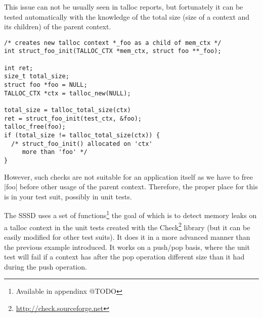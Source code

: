 This issue can not be usually seen in talloc reports, but fortunately it can be
tested automatically with the knowledge of the total size (size of a context and
its children) of the parent context.

\begin{lstlisting}[caption={Memory leaks detection \#1},
morekeywords={talloc_total_size,talloc_free}]
/* creates new talloc context *_foo as a child of mem_ctx */
int struct_foo_init(TALLOC_CTX *mem_ctx, struct foo **_foo);

int ret;
size_t total_size;
struct foo *foo = NULL;
TALLOC_CTX *ctx = talloc_new(NULL);

total_size = talloc_total_size(ctx)
ret = struct_foo_init(test_ctx, &foo);
talloc_free(foo);
if (total_size != talloc_total_size(ctx)) {
  /* struct_foo_init() allocated on 'ctx'
     more than 'foo' */
}
\end{lstlisting}

\noindent
However, such checks are not suitable for an application itself as we have to
free |foo| before other usage of the parent context. Therefore, the proper place
for this is in your test suit, possibly in unit tests.

The SSSD uses a set of functions\footnote{Available in appendinx @TODO} the goal
of which is to detect memory leaks on a talloc context in the unit tests created
with the Check\footnote{\url{http://check.sourceforge.net}} library (but it can
be easily modified for other test suits). It does it in a more advanced manner
than the previous example introduced. It works on a push/pop basis, where the
unit test will fail if a context has after the pop operation different size
than it had during the push operation.

